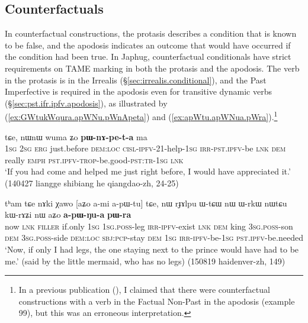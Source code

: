  \subsection{Counterfactuals} \label{sec:counterfactual}
In counterfactual constructions, the protasis describes a condition that is known to be false, and the apodosis indicates an outcome that would have occurred if the condition had been true. In Japhug, counterfactual conditionals have strict requirements on TAME marking in both the protasis and the apodosis. The verb in the protasis is in the  Irrealis (§\ref{sec:irrealis.conditional}), and the Past Imperfective is required in the apodosis even for transitive dynamic verbs (§\ref{sec:pst.ifr.ipfv.apodosis}), as illustrated by (\ref{ex:GWtukWqura.apWNu.pWnApeta}) and (\ref{ex:apWtu.apWNua.pWra}).\footnote{In a previous publication (\citealt[301]{jacques14linking}), I claimed that there were counterfactual constructions with a verb in the Factual Non-Past in the apodosis (example 99), but this was an erroneous interpretation.  }
 
 \begin{exe}
\ex \label{ex:GWtukWqura.apWNu.pWnApeta}
 tɕe, nɯnɯ wuma ʑo \textbf{pɯ-nɤ-pe-t-a} ma \\
\textsc{1sg} \textsc{2sg} \textsc{erg} just.before \textsc{dem}:\textsc{loc} \textsc{cisl}-\textsc{ipfv}-2\fl{}1-help-\textsc{1sg} \textsc{irr}-\textsc{pst}.\textsc{ipfv}-be \textsc{lnk} \textsc{dem} really \textsc{emph} \textsc{pst}.\textsc{ipfv}-\textsc{trop}-be.good-\textsc{pst}:\textsc{tr}-\textsc{1sg} \textsc{lnk} \\
\glt `If you had come and helped me just right before, I would have appreciated it.' (140427 liangge shibiang he qiangdao-zh, 24-25)
\end{exe}
 
\begin{exe}
\ex \label{ex:apWtu.apWNua.pWra}
\gll tʰam tɕe nɤki χawo [aʑo a-mi a-pɯ-tu] tɕe, nɯ rɟɤlpu ɯ-tɕɯ nɯ ɯ-rkɯ nɯtɕu kɯ-rɤʑi nɯ aʑo \textbf{a-pɯ-ŋu-a} \textbf{pɯ-ra} \\
now \textsc{lnk} \textsc{filler} if.only \textsc{1sg} \textsc{1sg}.\textsc{poss}-leg \textsc{irr}-\textsc{ipfv}-exist \textsc{lnk} \textsc{dem} king \textsc{3sg}.\textsc{poss}-son \textsc{dem} \textsc{3sg}.\textsc{poss}-side \textsc{dem}:\textsc{loc} \textsc{sbj}:\textsc{pcp}-stay \textsc{dem} \textsc{1sg} \textsc{irr}-\textsc{ipfv}-be-\textsc{1sg} \textsc{pst}.\textsc{ipfv}-be.needed \\
\glt `Now, if only I had legs, the one staying next to the prince would have had to be me.' (said by the little mermaid, who has no legs) (150819 haidenver-zh, 149)
\end{exe}

